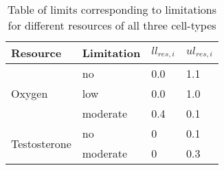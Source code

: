 \begin{table}
\centering
  \begin{tabular}{|l|l|l|l|}
    \hline
    \textbf{Resource} & \textbf{Limitation} & \textbf{$ll_{res,i}$} & \textbf{$ul_{res,i}$} \\ \hline
    \multirow{3}{*}{Oxygen} & no & 0.0 & 1.1 \\ \cline{2-4}
    & low & 0.0 & 1.0 \\ \cline{2-4}
    & moderate & 0.4 & 0.1 \\ \hline
    \multirow{3}{*}{Testosterone} & no & 0 & 0.1 \\ \cline{2-4}
    & moderate & 0 & 0.3 \\ \hline
  \end{tabular}
  \caption[Table of resource limitations for all cell types]{Table of limits corresponding to limitations for different resources of all three cell-types}
  \label{tab_all3_limits}
\end{table}

\newpage

